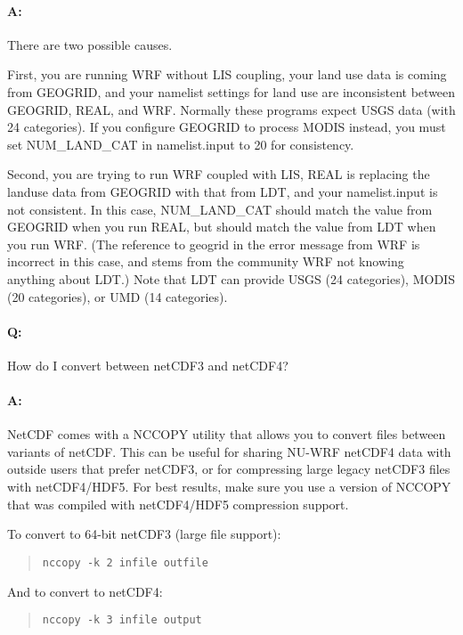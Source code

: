 \paragraph{A:} There are two possible causes.

First, you are running WRF without LIS coupling, your land use data is coming
from GEOGRID, and your namelist settings for land use are inconsistent between
GEOGRID, REAL, and WRF. Normally these programs expect USGS data (with 24 
categories). If you configure GEOGRID to process MODIS instead, you must set 
NUM\_LAND\_CAT in namelist.input to 20 for consistency.

Second, you are trying to run WRF coupled with LIS, REAL is replacing the 
landuse data from GEOGRID with that from LDT, and your namelist.input is not
consistent. In this case, NUM\_LAND\_CAT should match the value from GEOGRID
when you run REAL, but should match the value from LDT when you run WRF. 
(The reference to geogrid in the error message from WRF is incorrect in this
case, and stems from the community WRF not knowing anything about LDT.) Note
that LDT can provide USGS (24 categories), MODIS (20 categories), or UMD
(14 categories).

\paragraph{Q:} How do I convert between netCDF3 and netCDF4?

\paragraph{A:} NetCDF comes with a NCCOPY utility that allows you to 
convert files between variants of netCDF.  This can be useful for sharing
NU-WRF netCDF4 data with outside users that prefer netCDF3, or for compressing
large legacy netCDF3 files with netCDF4/HDF5. For best results, make sure you 
use a version of NCCOPY that was compiled with netCDF4/HDF5 compression 
support.

To convert to 64-bit netCDF3 (large file support):

\begin{quote}
\texttt{nccopy -k 2 infile outfile}
\end{quote}

And to convert to netCDF4:

\begin{quote}
\texttt{nccopy -k 3 infile output}
\end{quote}

